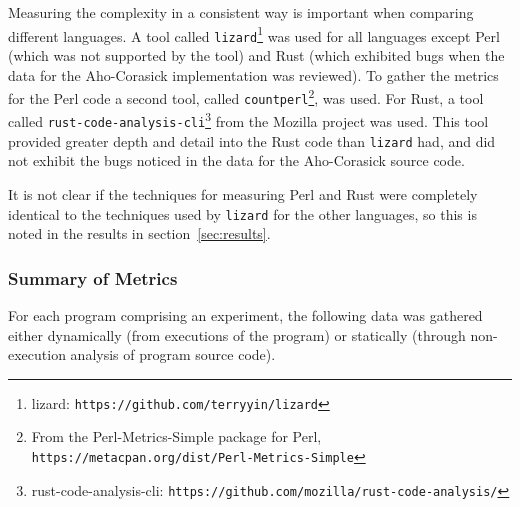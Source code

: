 Measuring the complexity in a consistent way is important when comparing different languages. A tool called \texttt{lizard}\footnote{lizard: \texttt{https://github.com/terryyin/lizard}} was used for all languages except Perl (which was not supported by the tool) and Rust (which exhibited bugs when the data for the Aho-Corasick implementation was reviewed). To gather the metrics for the Perl code a second tool, called \texttt{countperl}\footnote{From the Perl-Metrics-Simple package for Perl, \texttt{https://metacpan.org/dist/Perl-Metrics-Simple}}, was used. For Rust, a tool called \texttt{rust-code-analysis-cli}\footnote{rust-code-analysis-cli: \texttt{https://github.com/mozilla/rust-code-analysis/}} from the Mozilla project was used. This tool provided greater depth and detail into the Rust code than \texttt{lizard} had, and did not exhibit the bugs noticed in the data for the Aho-Corasick source code.

It is not clear if the techniques for measuring Perl and Rust were completely identical to the techniques used by \texttt{lizard} for the other languages, so this is noted in the results in section~\ref{sec:results}.

\subsubsection{Summary of Metrics}

For each program comprising an experiment, the following data was gathered either dynamically (from executions of the program) or statically (through non-execution analysis of program source code).


